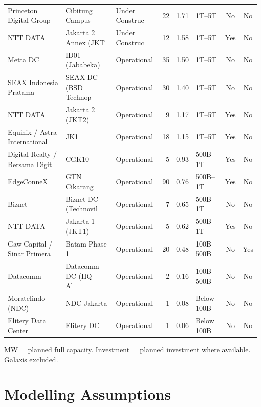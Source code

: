\documentclass[11pt,english]{article}
\begin{document}
\begin{appendices}
\begin{table}[H]
\begin{threeparttable}
\begin{tabular}{l l l r r l c c}
  Princeton Digital Group & Cibitung Campus & Under Construc & 22 & 1.71 & 1T--5T & No & No \\
  NTT DATA & Jakarta 2 Annex (JKT & Under Construc & 12 & 1.58 & 1T--5T & Yes & No \\
  Metta DC & ID01 (Jababeka) & Operational & 35 & 1.50 & 1T--5T & No & No \\
  SEAX Indonesia Pratama & SEAX DC (BSD Technop & Operational & 30 & 1.40 & 1T--5T & No & No \\
  NTT DATA & Jakarta 2 (JKT2) & Operational & 9 & 1.17 & 1T--5T & Yes & No \\
  Equinix / Astra International & JK1 & Operational & 18 & 1.15 & 1T--5T & Yes & No \\
  Digital Realty / Bersama Digit & CGK10 & Operational & 5 & 0.93 & 500B--1T & Yes & No \\
  EdgeConneX & GTN Cikarang & Operational & 90 & 0.76 & 500B--1T & Yes & No \\
  Biznet & Biznet DC (Technovil & Operational & 7 & 0.65 & 500B--1T & No & No \\
  NTT DATA & Jakarta 1 (JKT1) & Operational & 5 & 0.62 & 500B--1T & Yes & No \\
  Gaw Capital / Sinar Primera & Batam Phase 1 & Operational & 20 & 0.48 & 100B--500B & No & Yes \\
  Datacomm & Datacomm DC (HQ + Al & Operational & 2 & 0.16 & 100B--500B & No & No \\
  Moratelindo (NDC) & NDC Jakarta & Operational & 1 & 0.08 & Below 100B & No & No \\
  Elitery Data Center & Elitery DC & Operational & 1 & 0.06 & Below 100B & No & No \\
\bottomrule
\end{tabular}
\begin{tablenotes}
\scriptsize
\item MW = planned full capacity. Investment = planned investment where available. Galaxis excluded.
\end{tablenotes}
\end{threeparttable}
\end{table}

\section{Modelling Assumptions}
\label{app:assumptions}


\end{appendices}
\end{document}
